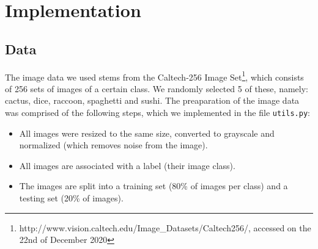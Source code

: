 \documentclass{scrartcl}
\begin{document}
\section{Implementation}
\subsection{Data}
The image data we used stems from the Caltech-256 Image Set\footnote{http://www.vision.caltech.edu/Image\_Datasets/Caltech256/, accessed on the 22nd of December 2020}, which consists of 256 sets of images of a certain class. We randomly selected 5 of these, namely: cactus, dice, raccoon, spaghetti and sushi. The preaparation of the image data was comprised of the following steps, which we implemented in the file \texttt{utils.py}:
\begin{itemize}
  \item All images were resized to the same size, converted to grayscale and normalized (which removes noise from the image).
  \item All images are associated with a label (their image class).
  \item The images are split into a training set (80\% of images per class) and a testing set (20\% of images).
\end{itemize}
\end{document}
